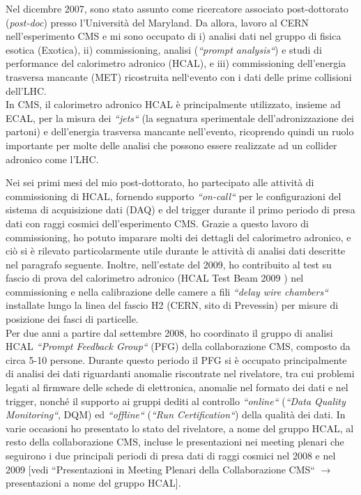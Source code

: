 \documentclass[10pt, a4paper]{article}
\begin{document}
Nel dicembre 2007, sono stato assunto come ricercatore associato post-dottorato ({\it post-doc}) presso 
l'Universit\`a del Maryland. Da allora, lavoro al CERN nell'esperimento CMS e mi sono occupato di i) analisi dati 
nel gruppo di fisica esotica (Exotica), ii) commissioning, analisi ({\it``prompt analysis``}) e studi di performance 
del calorimetro adronico (HCAL), e iii) commissioning dell'energia trasversa mancante (MET) ricostruita 
nell`evento con i dati delle prime collisioni dell'LHC. \\

In CMS, il calorimetro adronico HCAL \`e principalmente utilizzato, insieme ad ECAL, per la misura dei 
{\it ``jets``} (la segnatura sperimentale dell'adronizzazione dei partoni) 
e dell'energia trasversa mancante nell'evento, ricoprendo quindi un ruolo importante per molte delle 
analisi che possono essere realizzate ad un collider adronico come l'LHC. 

Nei sei primi mesi del mio 
post-dottorato, ho partecipato alle attivit\`a di commissioning di HCAL, fornendo supporto {\it ``on-call``} 
per le configurazioni del sistema di acquisizione dati (DAQ) e del trigger durante il primo periodo di presa dati 
con raggi cosmici dell'esperimento CMS. Grazie a questo lavoro di commissioning, ho potuto imparare molti dei dettagli del calorimetro 
adronico, e ci\`o si \`e rilevato particolarmente utile durante le attivit\`a di analisi dati descritte nel paragrafo seguente. 
Inoltre, nell'estate del 2009, ho contribuito al test su fascio di prova del 
calorimetro adronico (HCAL Test Beam 2009 \cite{Chatrchyan:2010zz}) nel commissioning e 
nella calibrazione delle camere a fili  {\it ``delay wire chambers``} installate lungo la linea del fascio 
H2 (CERN, sito di Prevessin) per misure di posizione dei fasci di particelle. \\

Per due anni a partire dal settembre 2008, ho coordinato il gruppo di analisi 
HCAL {\it ``Prompt Feedback Group``} (PFG) della collaborazione CMS, composto da circa 5-10 persone. 
Durante questo periodo il PFG si \`e occupato principalmente di analisi dei dati riguardanti anomalie 
riscontrate nel rivelatore, tra cui problemi legati al firmware 
delle schede di elettronica, anomalie nel formato dei dati e nel trigger, nonch\'e il supporto ai gruppi dediti al 
controllo {\it ``online``} ({\it ``Data Quality Monitoring``}, DQM) ed {\it ``offline``} 
({\it ``Run Certification``}) della qualit\`a dei dati.
In varie occasioni ho presentato lo stato del rivelatore, a nome del gruppo HCAL, al resto della collaborazione CMS, 
incluse le presentazioni nei meeting plenari che seguirono i due principali periodi di presa dati di raggi cosmici 
nel 2008 e nel 2009 [vedi ``Presentazioni in Meeting Plenari della Collaborazione CMS`` $\rightarrow$  
presentazioni a nome del gruppo HCAL]. 
\end{document}
